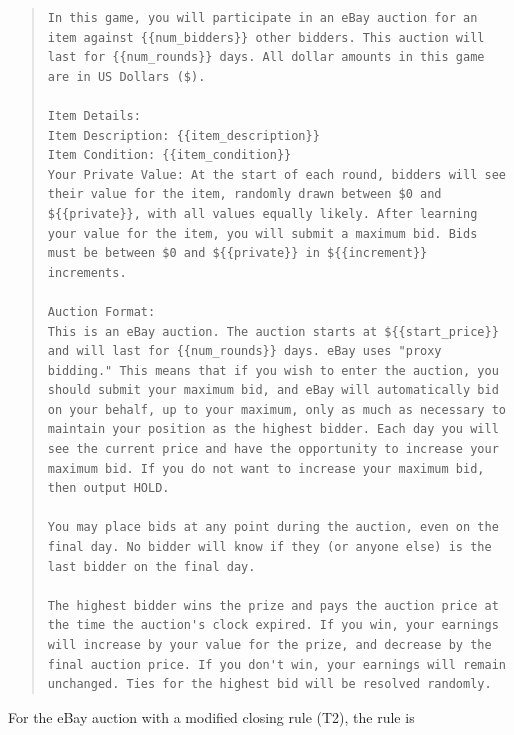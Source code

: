 \documentclass{article} %
\begin{document}
\begin{quote}
\begin{lstlisting}[basicstyle=\ttfamily, breaklines=true]
In this game, you will participate in an eBay auction for an item against {{num_bidders}} other bidders. This auction will last for {{num_rounds}} days. All dollar amounts in this game are in US Dollars ($).

Item Details:
Item Description: {{item_description}}
Item Condition: {{item_condition}}
Your Private Value: At the start of each round, bidders will see their value for the item, randomly drawn between $0 and ${{private}}, with all values equally likely. After learning your value for the item, you will submit a maximum bid. Bids must be between $0 and ${{private}} in ${{increment}} increments.

Auction Format:
This is an eBay auction. The auction starts at ${{start_price}} and will last for {{num_rounds}} days. eBay uses "proxy bidding." This means that if you wish to enter the auction, you should submit your maximum bid, and eBay will automatically bid on your behalf, up to your maximum, only as much as necessary to maintain your position as the highest bidder. Each day you will see the current price and have the opportunity to increase your maximum bid. If you do not want to increase your maximum bid, then output HOLD.

You may place bids at any point during the auction, even on the final day. No bidder will know if they (or anyone else) is the last bidder on the final day.

The highest bidder wins the prize and pays the auction price at the time the auction's clock expired. If you win, your earnings will increase by your value for the prize, and decrease by the final auction price. If you don't win, your earnings will remain unchanged. Ties for the highest bid will be resolved randomly.
\end{lstlisting}
\end{quote}

For the eBay auction with a modified closing rule (T2), the rule is
\end{document}
